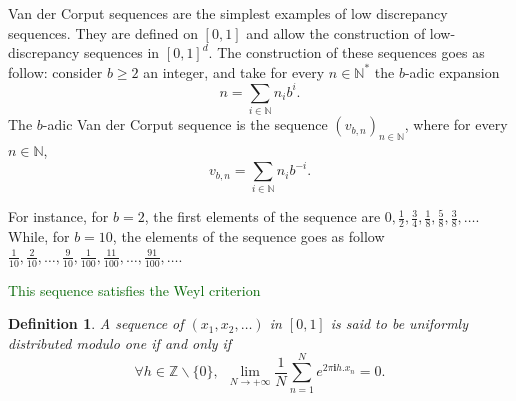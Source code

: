 \documentclass[twoside,11pt]{book}
\newcommand{\rev}[1]{\textcolor{darkgreen}{#1}}
\newtheorem{definition}{Definition}
\numberwithin{theorem}{chapter}
\numberwithin{definition}{chapter}
\numberwithin{proposition}{chapter}
\numberwithin{corollary}{chapter}
\numberwithin{example}{chapter}
\numberwithin{lemma}{chapter}
\numberwithin{assumption}{chapter}
\begin{document}

Van der Corput sequences are the simplest examples of low discrepancy sequences. They are defined on $[0,1]$ and allow the construction of low-discrepancy sequences in $[0,1]^{d}$.
The construction of these sequences goes as follow: consider $b \geq 2$ an integer, and take for every $n \in \mathbb{N}^{*}$ the $b$-adic expansion
\begin{equation}
n = \sum\limits_{i \in \mathbb{N}} n_{i}b^{i}.
\end{equation} 
The $b$-adic Van der Corput sequence is the sequence $(v_{b,n})_{n \in \mathbb{N}}$, where for every $n \in \mathbb{N}$, 
\begin{equation}
v_{b,n} = \sum\limits_{i \in \mathbb{N}} n_{i}b^{-i}. 
\end{equation}


For instance, for $b = 2$, the first elements of the sequence are $\displaystyle 0, \frac{1}{2}, \frac{3}{4}, \frac{1}{8}, \frac{5}{8}, \frac{3}{8}, \dots$. While, for $b=10$, the elements of the sequence goes as follow $\displaystyle \frac{1}{10}, \frac{2}{10}, \dots, \frac{9}{10}, \frac{1}{100}, \frac{11}{100}, \dots ,\frac{91}{100}, \dots$.

\rev{This sequence satisfies the Weyl criterion }
\begin{definition}
A sequence of $(x_{1}, x_{2}, \dots)$ in $[0,1]$ is said to be \emph{uniformly distributed modulo one} if and only if
\begin{equation}
\forall h \in \mathbb{Z} \smallsetminus \{0\}, \:\: \lim\limits_{N \rightarrow +\infty} \frac{1}{N} \sum\limits_{n =1}^{N} e^{2 \pi \mathbf{i} h . x_{n}} = 0.
\end{equation}
\end{definition}
\end{document}
